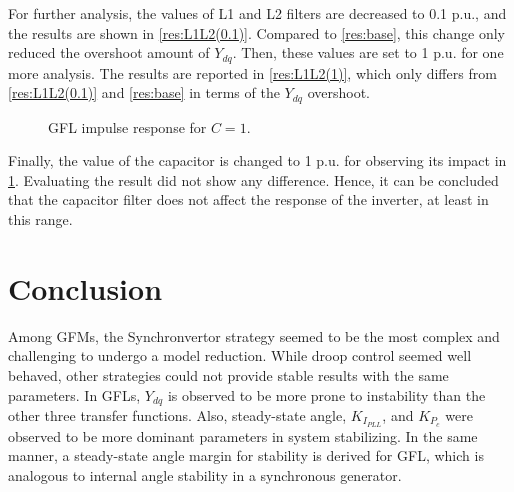  For further analysis, the values of L1 and L2 filters are decreased to 0.1 p.u., and the results are shown in \ref{res:L1L2(0.1)}. Compared to \ref{res:base}, this change only reduced the overshoot amount of $Y_{dq}$. Then, these values are set to 1 p.u. for one more analysis. The results are reported in \ref{res:L1L2(1)}, which only differs from \ref{res:L1L2(0.1)} and \ref{res:base} in terms of the $Y_{dq}$ overshoot.

\begin{figure}[ht]
\begin{center}
    \centering
   \nonindent
	\caption[GFL impulse response for $C=1$]{GFL impulse response for $C=1$.}
	\label{res:C(1)}
	\end{center}
\end{figure}


Finally, the value of the capacitor is changed to 1 p.u. for observing its impact in \ref{res:C(1)}. Evaluating the result did not show any difference. Hence, it can be concluded that the capacitor filter does not affect the response of the inverter, at least in this range.

\section{Conclusion}

Among GFMs, the Synchronvertor strategy seemed to be the most complex and challenging to undergo a model reduction. While droop control seemed well behaved, other strategies could not provide stable results with the same parameters. In GFLs, $Y_{dq}$ is observed to be more prone to instability than the other three transfer functions. Also, steady-state angle, $K_I_{PLL}$, and $K_P_{c}$ were observed to be more dominant parameters in system stabilizing. In the same manner, a steady-state angle margin for stability is derived for GFL, which is analogous to internal angle stability in a synchronous generator.
